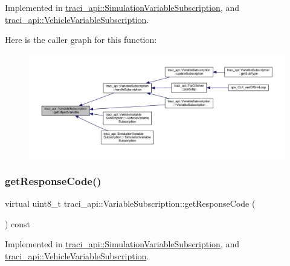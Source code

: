 Implemented in \hyperlink{classtraci__api_1_1_simulation_variable_subscription_aaa64f6368289ff45730d718e3f38f762}{traci\+\_\+api\+::\+Simulation\+Variable\+Subscription}, and \hyperlink{classtraci__api_1_1_vehicle_variable_subscription_afaefff100368a747aefb8be29e8a7a91}{traci\+\_\+api\+::\+Vehicle\+Variable\+Subscription}.

Here is the caller graph for this function\+:
\nopagebreak
\begin{figure}[H]
\begin{center}
\leavevmode
\includegraphics[width=350pt]{classtraci__api_1_1_variable_subscription_a884dba03a44455e86c417c3641ec6aa4_icgraph}
\end{center}
\end{figure}
\mbox{\label{classtraci__api_1_1_variable_subscription_a3e852072c435d02f96ff91f81506cef9}} 
\subsubsection{\texorpdfstring{get\+Response\+Code()}{getResponseCode()}}
{\footnotesize\ttfamily virtual uint8\+\_\+t traci\+\_\+api\+::\+Variable\+Subscription\+::get\+Response\+Code (\begin{DoxyParamCaption}{ }\end{DoxyParamCaption}) const\hspace{0.3cm}{\ttfamily [pure virtual]}}



Implemented in \hyperlink{classtraci__api_1_1_simulation_variable_subscription_a1f5a6a5d62fe7a054f87311b0c5b6f5f}{traci\+\_\+api\+::\+Simulation\+Variable\+Subscription}, and \hyperlink{classtraci__api_1_1_vehicle_variable_subscription_a77ac472ae8dc1f284c2ec3f64b88cd0d}{traci\+\_\+api\+::\+Vehicle\+Variable\+Subscription}.

